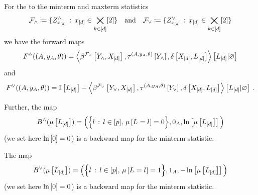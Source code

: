 \begin{theorem}
    For the \HybridLogicNetworks{} to the minterm and maxterm statistics
    \begin{align*}
        \mathcal{F}_{\land} \coloneqq \{ Z^{\land}_{x_{[d]}} \,:\, x_{[d]}\in\bigtimes_{k\in[d]}[2]\}
        \quad\text{and}\quad
        \mathcal{F}_{\lor} \coloneqq \{ Z^{\lor}_{x_{[d]}} \,:\, x_{[d]}\in\bigtimes_{k\in[d]}[2]\}
    \end{align*}
    we have the forward maps
    \begin{align*}
        F^{\land}((A,y_{A},\theta))
        = \left\langle \beta^{\mathcal{F}_{\land}}\left[Y_{\land},X_{[d]}\right],
            \tau^{(A,y_{A},\theta)}\left[Y_{\land}\right],\delta\left[X_{[d]},L_{[d]}\right]\right\rangle \left[ L_{[d]} | \varnothing \right]
    \end{align*}
    and
    \begin{align*}
        F^{\lor}((A,y_{A},\theta))
        = \mathbb{I}\left[L_{[d]}\right] - \left\langle \beta^{\mathcal{F}_{\lor}}\left[Y_{\lor},X_{[d]}\right],
            \tau^{(A,y_{A},\theta)}\left[Y_{\lor}\right],\delta\left[X_{[d]},L_{[d]}\right]\right\rangle \left[ L_{[d]} | \varnothing \right] \, .
    \end{align*}

    Further, the map
    \begin{align*}
        B^{\land}(\mu\left[L_{[d]}\right])
        = \Big(\Big\{ l \,:\, l\in[p] ,\, \mu\left[L_{}=l_{}\right]=0 \Big\},0_{A},\ln \left[ \mu\left[L_{[d]}\right] \right]\Big)
    \end{align*}
    (we set here $\ln \left[ 0 \right]=0$) is a backward map for the minterm statistic.

    The map
    \begin{align*}
        B^{\lor}(\mu\left[L_{[d]}\right])
        = \Big(\Big\{ l \,:\, l\in[p] ,\, \mu\left[L_{}=l_{}\right]=1 \Big\},1_{A},-\ln \left[ \mu\left[L_{[d]}\right] \right]\Big)
    \end{align*}
    (we set here $\ln \left[ 0 \right]=0$) is a backward map for the minterm statistic.
\end{theorem}
